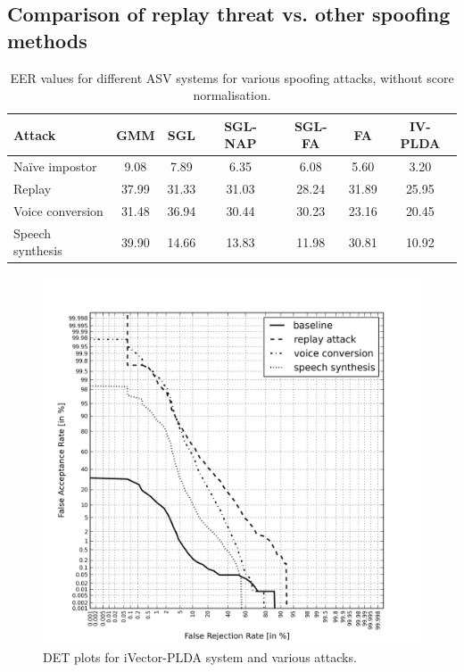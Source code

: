 \subsection{Comparison of replay threat vs. other spoofing methods}

\begin{table}
\begin{center}
    \begin{tabular}{ l || c c c c c c}
    \hline
     	 Attack & GMM & SGL & SGL-NAP & SGL-FA & FA & IV-PLDA \\ 

 \hline \hline
Na\"{i}ve impostor & 9.08 & 7.89 & 6.35 & 6.08 & 5.60 & 3.20\\ 
Replay & 37.99	& 31.33 & 31.03 & 28.24 & 31.89 & 25.95\\
Voice conversion & 31.48 & 36.94 & 30.44 & 30.23 & 23.16 & 20.45\\ 
Speech synthesis & 39.90 & 14.66 & 13.83 & 11.98 & 30.81 & 10.92\\ 
\hline
    \end{tabular}
    \caption{EER values for different ASV systems for various spoofing attacks, without score normalisation.}
		\label{tab::results_EER_4attacks}
   \end{center}
\end{table}


\begin{figure}
	\centering
	\includegraphics[width=1\linewidth]{Figs/DET_IV_ss_vc_rp.png}
	\caption{DET plots for iVector-PLDA system and various attacks.}
	\label{fig::DETs_4attacks}
\end{figure}

